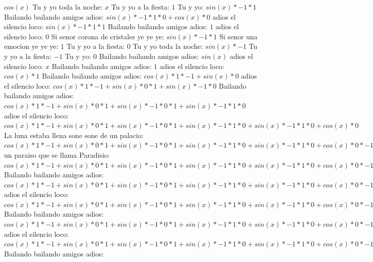 \documentclass{article}
\begin{document}
$cos(x)$  \newline Tu y yo toda la noche: $x$ Tu y yo a la fiesta: $1$  \newline Tu y yo: $sin(x)*-1*1$ Bailando bailando amigos adios: $sin(x)*-1*1*0+cos(x)*0$ adios el silencio loco: $sin(x)*-1*1*1$ Bailando bailando amigos adios: $1$ adios el silencio loco: $0$  \newline Si senor corona de cristales ye ye ye: $sin(x)*-1*1$ Si senor una emocion ye ye ye: $1$ Tu y yo a la fiesta: $0$  \newline Tu y yo toda la noche: $sin(x)*-1$ Tu y yo a la fiesta: $-1$ Tu y yo: $0$  \newline Bailando bailando amigos adios: $sin(x)$  \newline adios el silencio loco: $x$ Bailando bailando amigos adios: $1$  \newline adios el silencio loco: $cos(x)*1$ Bailando bailando amigos adios: $cos(x)*1*-1+sin(x)*0$ adios el silencio loco: ${cos(x)*1*-1+sin(x)*0}*1+sin(x)*-1*0$ Bailando bailando amigos adios: ${{cos(x)*1*-1+sin(x)*0}*1+sin(x)*-1*0}*1+sin(x)*-1*1*0$ adios el silencio loco: ${{cos(x)*1*-1+sin(x)*0}*1+sin(x)*-1*0}*1+sin(x)*-1*1*0+sin(x)*-1*1*0+cos(x)*0$ La luna estaba llena sone sone de un palacio: ${{{cos(x)*1*-1+sin(x)*0}*1+sin(x)*-1*0}*1+sin(x)*-1*1*0+sin(x)*-1*1*0+cos(x)*0}*-1+{sin(x)*-1*1*1+cos(x)*0}*0$ un paraiso que se llama Paradisio: ${{{cos(x)*1*-1+sin(x)*0}*1+sin(x)*-1*0}*1+sin(x)*-1*1*0+sin(x)*-1*1*0+cos(x)*0}*-1+{sin(x)*-1*1*1+cos(x)*0}*0+{sin(x)*-1*1*1+cos(x)*0}*0+cos(x)*1*0$ Bailando bailando amigos adios: ${{{cos(x)*1*-1+sin(x)*0}*1+sin(x)*-1*0}*1+sin(x)*-1*1*0+sin(x)*-1*1*0+cos(x)*0}*-1+{sin(x)*-1*1*1+cos(x)*0}*0+{sin(x)*-1*1*1+cos(x)*0}*0+cos(x)*1*0+{sin(x)*-1*1*1+cos(x)*0}*0+cos(x)*1*0+cos(x)*1*0+sin(x)*0$ adios el silencio loco: ${{{{cos(x)*1*-1+sin(x)*0}*1+sin(x)*-1*0}*1+sin(x)*-1*1*0+sin(x)*-1*1*0+cos(x)*0}*-1+{sin(x)*-1*1*1+cos(x)*0}*0+{sin(x)*-1*1*1+cos(x)*0}*0+cos(x)*1*0+{sin(x)*-1*1*1+cos(x)*0}*0+cos(x)*1*0+cos(x)*1*0+sin(x)*0}*0+{{sin(x)*-1*1*1+cos(x)*0}*-1+cos(x)*1*0+cos(x)*1*0+sin(x)*0}*0$ Bailando bailando amigos adios: ${{{{cos(x)*1*-1+sin(x)*0}*1+sin(x)*-1*0}*1+sin(x)*-1*1*0+sin(x)*-1*1*0+cos(x)*0}*-1+{sin(x)*-1*1*1+cos(x)*0}*0+{sin(x)*-1*1*1+cos(x)*0}*0+cos(x)*1*0+{sin(x)*-1*1*1+cos(x)*0}*0+cos(x)*1*0+cos(x)*1*0+sin(x)*0}*0+{{sin(x)*-1*1*1+cos(x)*0}*-1+cos(x)*1*0+cos(x)*1*0+sin(x)*0}*0+{{sin(x)*-1*1*1+cos(x)*0}*-1+cos(x)*1*0+cos(x)*1*0+sin(x)*0}*0+{cos(x)*1*-1+sin(x)*0}*0$ adios el silencio loco: ${{{{cos(x)*1*-1+sin(x)*0}*1+sin(x)*-1*0}*1+sin(x)*-1*1*0+sin(x)*-1*1*0+cos(x)*0}*-1+{sin(x)*-1*1*1+cos(x)*0}*0+{sin(x)*-1*1*1+cos(x)*0}*0+cos(x)*1*0+{sin(x)*-1*1*1+cos(x)*0}*0+cos(x)*1*0+cos(x)*1*0+sin(x)*0}*0+{{sin(x)*-1*1*1+cos(x)*0}*-1+cos(x)*1*0+cos(x)*1*0+sin(x)*0}*0+{{sin(x)*-1*1*1+cos(x)*0}*-1+cos(x)*1*0+cos(x)*1*0+sin(x)*0}*0+{cos(x)*1*-1+sin(x)*0}*0+{{sin(x)*-1*1*1+cos(x)*0}*-1+cos(x)*1*0+cos(x)*1*0+sin(x)*0}*0+{cos(x)*1*-1+sin(x)*0}*0+{cos(x)*1*-1+sin(x)*0}*0+sin(x)*-1*0$ Bailando bailando amigos adios: 
\end{document}

